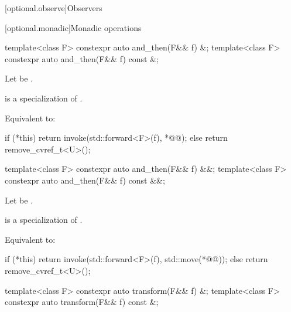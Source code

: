 [optional.observe]{Observers}

[optional.monadic]{Monadic operations}

\begin{itemdecl}
template<class F> constexpr auto and_then(F&& f) &;
template<class F> constexpr auto and_then(F&& f) const &;
\end{itemdecl}

\begin{itemdescr}
\pnum
Let  be .

\pnum
\mandates
{} is a specialization of .

\pnum
\effects
Equivalent to:
\begin{codeblock}
if (*this) {
  return invoke(std::forward<F>(f), *@@);
} else {
  return remove_cvref_t<U>();
}
\end{codeblock}
\end{itemdescr}

\begin{itemdecl}
template<class F> constexpr auto and_then(F&& f) &&;
template<class F> constexpr auto and_then(F&& f) const &&;
\end{itemdecl}

\begin{itemdescr}
\pnum
Let  be .

\pnum
\mandates
{} is a specialization of .

\pnum
\effects
Equivalent to:
\begin{codeblock}
if (*this) {
  return invoke(std::forward<F>(f), std::move(*@@));
} else {
  return remove_cvref_t<U>();
}
\end{codeblock}
\end{itemdescr}

\begin{itemdecl}
template<class F> constexpr auto transform(F&& f) &;
template<class F> constexpr auto transform(F&& f) const &;
\end{itemdecl}

